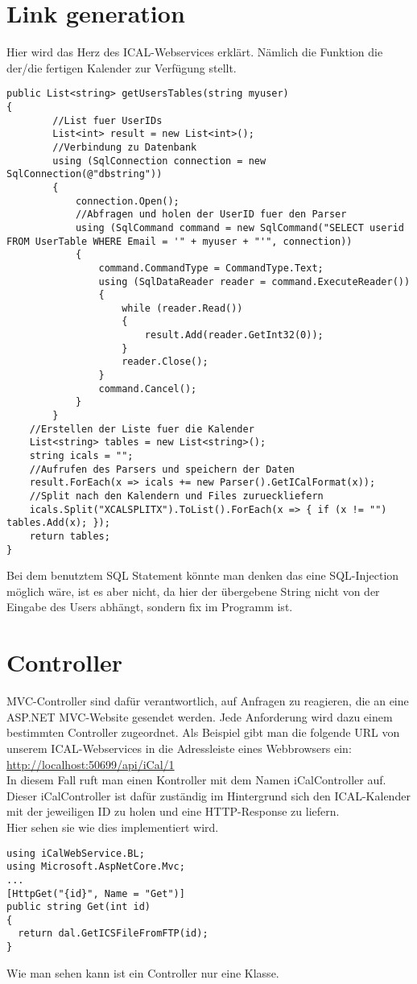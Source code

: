 {\section{Link generation}
\label{sec:link}
Hier wird das Herz des ICAL-Webservices erklärt. Nämlich die Funktion die der/die fertigen Kalender zur Verfügung stellt.
\begin{lstlisting}
public List<string> getUsersTables(string myuser)
{
        //List fuer UserIDs
        List<int> result = new List<int>();
        //Verbindung zu Datenbank
        using (SqlConnection connection = new SqlConnection(@"dbstring"))
        {
            connection.Open();
            //Abfragen und holen der UserID fuer den Parser
            using (SqlCommand command = new SqlCommand("SELECT userid FROM UserTable WHERE Email = '" + myuser + "'", connection))
            {
                command.CommandType = CommandType.Text;
                using (SqlDataReader reader = command.ExecuteReader())
                {
                    while (reader.Read())
                    {
                        result.Add(reader.GetInt32(0));
                    }
                    reader.Close();
                }
                command.Cancel();
            }
        }
    //Erstellen der Liste fuer die Kalender
    List<string> tables = new List<string>();
    string icals = "";
    //Aufrufen des Parsers und speichern der Daten
    result.ForEach(x => icals += new Parser().GetICalFormat(x));
    //Split nach den Kalendern und Files zurueckliefern
    icals.Split("XCALSPLITX").ToList().ForEach(x => { if (x != "") tables.Add(x); });
    return tables;
}
\end{lstlisting}
Bei dem benutztem SQL Statement könnte man denken das eine SQL-Injection möglich wäre, ist es aber nicht, da hier der übergebene String nicht von der Eingabe des Users abhängt, sondern fix im Programm ist.
\section{Controller}
\label{sec:Controller}
MVC-Controller sind dafür verantwortlich, auf Anfragen zu reagieren, die an eine ASP.NET MVC-Website gesendet werden. Jede Anforderung wird dazu einem bestimmten Controller zugeordnet. Als Beispiel gibt man die folgende URL von unserem ICAL-Webservices in die Adressleiste eines Webbrowsers ein:\\
\url{http://localhost:50699/api/iCal/1} \\
In diesem Fall ruft man einen Kontroller mit dem Namen iCalController auf. Dieser iCalController ist dafür zuständig im Hintergrund sich den ICAL-Kalender mit der jeweiligen ID zu holen und eine HTTP-Response zu liefern.\\ Hier sehen sie wie dies implementiert wird.
\begin{lstlisting}
using iCalWebService.BL;
using Microsoft.AspNetCore.Mvc;
...
[HttpGet("{id}", Name = "Get")]
public string Get(int id)
{
  return dal.GetICSFileFromFTP(id);
}
\end{lstlisting}
Wie man sehen kann ist ein Controller nur eine Klasse.
}
